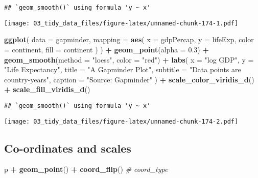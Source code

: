 \documentclass[
]{book}
\newenvironment{Shaded}{\begin{snugshade}}{\end{snugshade}}
\newcommand{\CommentTok}[1]{\textcolor[rgb]{0.56,0.35,0.01}{\textit{#1}}}
\newcommand{\DataTypeTok}[1]{\textcolor[rgb]{0.13,0.29,0.53}{#1}}
\newcommand{\FloatTok}[1]{\textcolor[rgb]{0.00,0.00,0.81}{#1}}
\newcommand{\KeywordTok}[1]{\textcolor[rgb]{0.13,0.29,0.53}{\textbf{#1}}}
\newcommand{\NormalTok}[1]{#1}
\newcommand{\OperatorTok}[1]{\textcolor[rgb]{0.81,0.36,0.00}{\textbf{#1}}}
\newcommand{\StringTok}[1]{\textcolor[rgb]{0.31,0.60,0.02}{#1}}
\begin{document}
\begin{verbatim}
## `geom_smooth()` using formula 'y ~ x'
\end{verbatim}

\texttt{[image: 03\_tidy\_data\_files/figure-latex/unnamed-chunk-174-1.pdf]}

\begin{Shaded}
\begin{Highlighting}[]
\KeywordTok{ggplot}\NormalTok{(}
  \DataTypeTok{data =}\NormalTok{ gapminder,}
  \DataTypeTok{mapping =} \KeywordTok{aes}\NormalTok{(}
    \DataTypeTok{x =}\NormalTok{ gdpPercap, }\DataTypeTok{y =}\NormalTok{ lifeExp,}
    \DataTypeTok{color =}\NormalTok{ continent,}
    \DataTypeTok{fill =}\NormalTok{ continent}
\NormalTok{  )}
\NormalTok{) }\OperatorTok{+}
\StringTok{  }\KeywordTok{geom\_point}\NormalTok{(}\DataTypeTok{alpha =} \FloatTok{0.3}\NormalTok{) }\OperatorTok{+}
\StringTok{  }\KeywordTok{geom\_smooth}\NormalTok{(}\DataTypeTok{method =} \StringTok{"loess"}\NormalTok{, }\DataTypeTok{color =} \StringTok{"red"}\NormalTok{) }\OperatorTok{+}
\StringTok{  }\KeywordTok{labs}\NormalTok{(}
    \DataTypeTok{x =} \StringTok{"log GDP"}\NormalTok{,}
    \DataTypeTok{y =} \StringTok{"Life Expectancy"}\NormalTok{,}
    \DataTypeTok{title =} \StringTok{"A Gapminder Plot"}\NormalTok{,}
    \DataTypeTok{subtitle =} \StringTok{"Data points are country{-}years"}\NormalTok{,}
    \DataTypeTok{caption =} \StringTok{"Source: Gapminder"}
\NormalTok{  ) }\OperatorTok{+}
\StringTok{  }\KeywordTok{scale\_color\_viridis\_d}\NormalTok{() }\OperatorTok{+}
\StringTok{  }\KeywordTok{scale\_fill\_viridis\_d}\NormalTok{()}
\end{Highlighting}
\end{Shaded}

\begin{verbatim}
## `geom_smooth()` using formula 'y ~ x'
\end{verbatim}

\texttt{[image: 03\_tidy\_data\_files/figure-latex/unnamed-chunk-174-2.pdf]}

\hypertarget{co-ordinates-and-scales}{%
\subsection{Co-ordinates and scales}\label{co-ordinates-and-scales}}

\begin{Shaded}
\begin{Highlighting}[]
\NormalTok{p }\OperatorTok{+}\StringTok{ }\KeywordTok{geom\_point}\NormalTok{() }\OperatorTok{+}
\StringTok{  }\KeywordTok{coord\_flip}\NormalTok{() }\CommentTok{\# coord\_type}
\end{Highlighting}
\end{Shaded}
\end{document}
